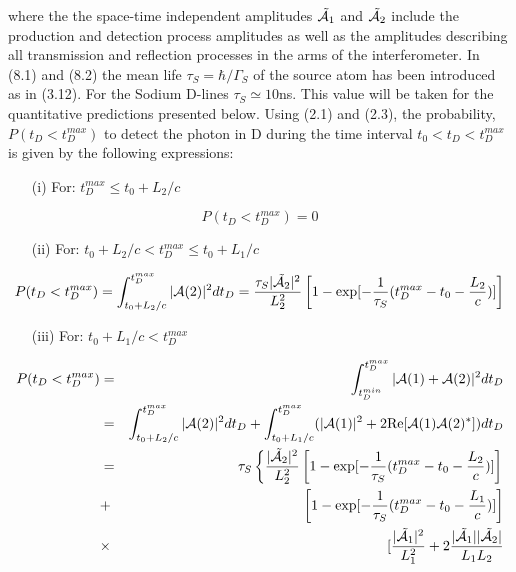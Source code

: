 {     where the the space-time independent amplitudes $\tilde{{\cal A}_1}$ and $\tilde{{\cal A}_2}$ include the
     production and detection process amplitudes as well as the amplitudes describing all transmission
     and reflection processes in the arms of the interferometer. In (8.1) and (8.2) the mean life
     $\tau_S = \hbar/\Gamma_S$ of the source atom has been introduced as in (3.12). For the Sodium
      D-lines $\tau_S \simeq 10$ns. This value will be taken for the quantitative predictions presented
     below.  Using (2.1) and (2.3), the probability, $P(t_D<t_D^{max})$ to detect the photon in D 
     during the time interval
      $t_0 < t_D < t_D^{max}$ is given by the following expressions:
       \begin{itemize}
    \item[(i)] For: $ t_D^{max} \le t_0 +L_2/c$
       \end{itemize}
     \begin{equation}
    P(t_D < t_D^{max}) = 0
     \end{equation}
     \begin{itemize}
    \item[(ii)] For: $t_0 +L_2/c < t_D^{max} \le t_0 +L_1/c$
       \end{itemize}
   \begin{equation}
   P(t_D < t_D^{max}) = \int_{t_0 +L_2/c}^{t_D^{max}} | {\cal A}(2)|^2 d t_D = \frac{\tau_S |\tilde{{\cal A}_2}|^2}
    {L_2^2}\left[1 - \exp[-\frac{1}{\tau_S}(t_D^{max}-t_0-\frac{L_2}{c})]\right]
    \end{equation}
      \begin{itemize}
    \item[(iii)] For: $t_0 +L_1/c < t_D^{max}$
     \end{itemize} 
 \begin{eqnarray}
   P(t_D < t_D^{max}) & = &   \int_{t_D^{min}}^{t_D^{max}} | {\cal A}(1)+{\cal A}(2)|^2 
   d t_D 
   \nonumber \\
  & = &  \int_{t_0 +L_2/c}^{t_D^{max}} | {\cal A}(2)|^2 d t_D +
     \int_{t_0 +L_1/c}^{t_D^{max}}(|{\cal A}(1)|^2 +2{\rm Re}[{\cal A}(1) {\cal A}(2)^{\ast}]) d t_D
  \nonumber \\
   & = & \tau_S \left\{ \frac{|\tilde{{\cal A}_2}|^2}{L_2^2}
 \left[1 - \exp[-\frac{1}{\tau_S}(t_D^{max}-t_0-\frac{L_2}{c})]\right] \right.
 \nonumber \\
  & + & \left[1 - \exp[-\frac{1}{\tau_S}(t_D^{max}-t_0-\frac{L_1}{c})]\right] \nonumber \\
   &\times & [ \frac{|\tilde{{\cal A}_1}|^2}{L_1^2} + 2 \frac{|\tilde{{\cal A}_1}||\tilde{{\cal A}_2}|}{L_1 L_2}

\end{eqnarray}}
